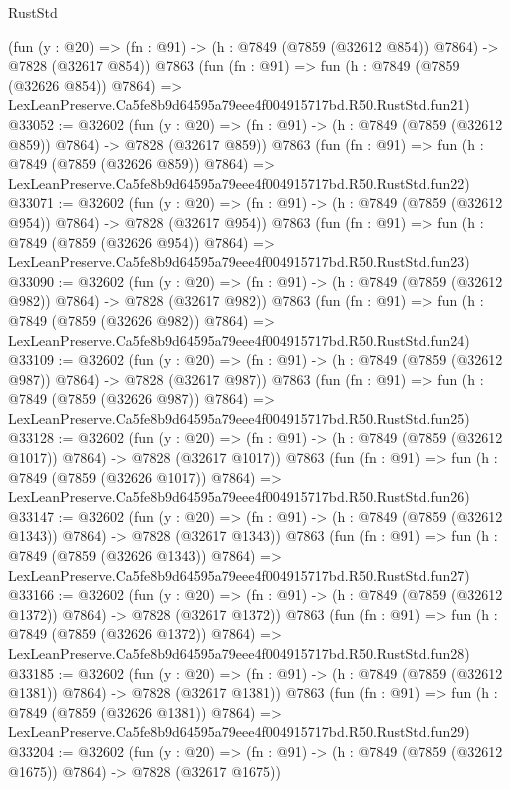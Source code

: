 \begin{lexlean}{RustStd}
\begin{coremodule}
    (fun (y : @20) => (fn : @91) -> (h : @7849 (@7859 (@32612 @854)) @7864) -> @7828 (@32617 @854))
    @7863
    (fun (fn : @91) =>
    fun (h : @7849 (@7859 (@32626 @854)) @7864) =>
    LexLeanPreserve.Ca5fe8b9d64595a79eee4f004915717bd.R50.RustStd.fun21)
@33052 := @32602
    (fun (y : @20) => (fn : @91) -> (h : @7849 (@7859 (@32612 @859)) @7864) -> @7828 (@32617 @859))
    @7863
    (fun (fn : @91) =>
    fun (h : @7849 (@7859 (@32626 @859)) @7864) =>
    LexLeanPreserve.Ca5fe8b9d64595a79eee4f004915717bd.R50.RustStd.fun22)
@33071 := @32602
    (fun (y : @20) => (fn : @91) -> (h : @7849 (@7859 (@32612 @954)) @7864) -> @7828 (@32617 @954))
    @7863
    (fun (fn : @91) =>
    fun (h : @7849 (@7859 (@32626 @954)) @7864) =>
    LexLeanPreserve.Ca5fe8b9d64595a79eee4f004915717bd.R50.RustStd.fun23)
@33090 := @32602
    (fun (y : @20) => (fn : @91) -> (h : @7849 (@7859 (@32612 @982)) @7864) -> @7828 (@32617 @982))
    @7863
    (fun (fn : @91) =>
    fun (h : @7849 (@7859 (@32626 @982)) @7864) =>
    LexLeanPreserve.Ca5fe8b9d64595a79eee4f004915717bd.R50.RustStd.fun24)
@33109 := @32602
    (fun (y : @20) => (fn : @91) -> (h : @7849 (@7859 (@32612 @987)) @7864) -> @7828 (@32617 @987))
    @7863
    (fun (fn : @91) =>
    fun (h : @7849 (@7859 (@32626 @987)) @7864) =>
    LexLeanPreserve.Ca5fe8b9d64595a79eee4f004915717bd.R50.RustStd.fun25)
@33128 := @32602
    (fun (y : @20) =>
    (fn : @91) -> (h : @7849 (@7859 (@32612 @1017)) @7864) -> @7828 (@32617 @1017))
    @7863
    (fun (fn : @91) =>
    fun (h : @7849 (@7859 (@32626 @1017)) @7864) =>
    LexLeanPreserve.Ca5fe8b9d64595a79eee4f004915717bd.R50.RustStd.fun26)
@33147 := @32602
    (fun (y : @20) =>
    (fn : @91) -> (h : @7849 (@7859 (@32612 @1343)) @7864) -> @7828 (@32617 @1343))
    @7863
    (fun (fn : @91) =>
    fun (h : @7849 (@7859 (@32626 @1343)) @7864) =>
    LexLeanPreserve.Ca5fe8b9d64595a79eee4f004915717bd.R50.RustStd.fun27)
@33166 := @32602
    (fun (y : @20) =>
    (fn : @91) -> (h : @7849 (@7859 (@32612 @1372)) @7864) -> @7828 (@32617 @1372))
    @7863
    (fun (fn : @91) =>
    fun (h : @7849 (@7859 (@32626 @1372)) @7864) =>
    LexLeanPreserve.Ca5fe8b9d64595a79eee4f004915717bd.R50.RustStd.fun28)
@33185 := @32602
    (fun (y : @20) =>
    (fn : @91) -> (h : @7849 (@7859 (@32612 @1381)) @7864) -> @7828 (@32617 @1381))
    @7863
    (fun (fn : @91) =>
    fun (h : @7849 (@7859 (@32626 @1381)) @7864) =>
    LexLeanPreserve.Ca5fe8b9d64595a79eee4f004915717bd.R50.RustStd.fun29)
@33204 := @32602
    (fun (y : @20) =>
    (fn : @91) -> (h : @7849 (@7859 (@32612 @1675)) @7864) -> @7828 (@32617 @1675))

\end{coremodule}
\end{lexlean}
